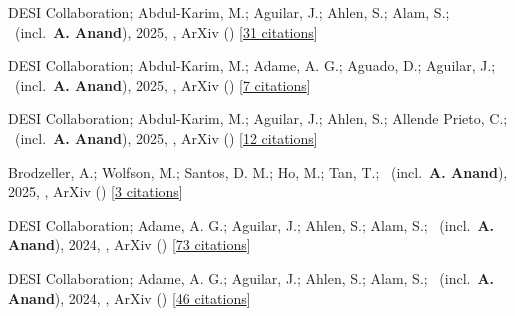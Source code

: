 \item[{\color{numcolor}\scriptsize10}] DESI Collaboration; Abdul-Karim, M.; Aguilar, J.; Ahlen, S.; Alam, S.; \etal\ (incl.\ \textbf{A. Anand}), 2025, , ArXiv () [\href{https://ui.adsabs.harvard.edu/abs/2025arXiv250314738D}{31 citations}]

\item[{\color{numcolor}\scriptsize9}] DESI Collaboration; Abdul-Karim, M.; Adame, A. G.; Aguado, D.; Aguilar, J.; \etal\ (incl.\ \textbf{A. Anand}), 2025, , ArXiv () [\href{https://ui.adsabs.harvard.edu/abs/2025arXiv250314745D}{7 citations}]

\item[{\color{numcolor}\scriptsize8}] DESI Collaboration; Abdul-Karim, M.; Aguilar, J.; Ahlen, S.; Allende Prieto, C.; \etal\ (incl.\ \textbf{A. Anand}), 2025, , ArXiv () [\href{https://ui.adsabs.harvard.edu/abs/2025arXiv250314739D}{12 citations}]

\item[{\color{numcolor}\scriptsize7}] Brodzeller, A.; Wolfson, M.; Santos, D. M.; Ho, M.; Tan, T.; \etal\ (incl.\ \textbf{A. Anand}), 2025, , ArXiv () [\href{https://ui.adsabs.harvard.edu/abs/2025arXiv250314740B}{3 citations}]

\item[{\color{numcolor}\scriptsize6}] DESI Collaboration; Adame, A. G.; Aguilar, J.; Ahlen, S.; Alam, S.; \etal\ (incl.\ \textbf{A. Anand}), 2024, , ArXiv () [\href{https://ui.adsabs.harvard.edu/abs/2024arXiv241112022D}{73 citations}]

\item[{\color{numcolor}\scriptsize5}] DESI Collaboration; Adame, A. G.; Aguilar, J.; Ahlen, S.; Alam, S.; \etal\ (incl.\ \textbf{A. Anand}), 2024, , ArXiv () [\href{https://ui.adsabs.harvard.edu/abs/2024arXiv241112021D}{46 citations}]

